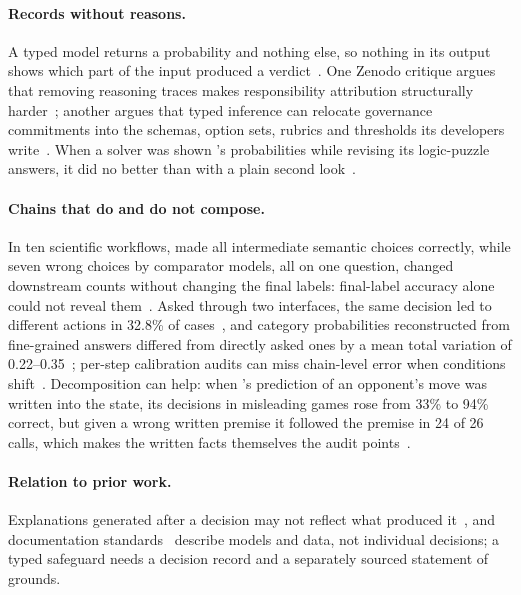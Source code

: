 \paragraph{Records without reasons.}
A typed model returns a probability and nothing else, so nothing in its output shows which part of the input produced a verdict~\cite{willison2026jev}.
One Zenodo critique argues that removing reasoning traces makes responsibility attribution structurally harder~\cite{zen22847531}\zmark{}; another argues that typed inference can relocate governance commitments into the schemas, option sets, rubrics and thresholds its developers write~\cite{zen22866847}\zmark{}.
When a solver was shown \jev{}'s probabilities while revising its logic-puzzle answers, it did no better than with a plain second look~\cite{zen22849329}\zmark{}.

\paragraph{Chains that do and do not compose.}
In ten scientific workflows, \jev{} made all intermediate semantic choices correctly, while seven wrong choices by comparator models, all on one question, changed downstream counts without changing the final labels: final-label accuracy alone could not reveal them~\cite{arx24965}.
Asked through two interfaces, the same decision led to different actions in 32.8\% of cases~\cite{arx37470}, and category probabilities reconstructed from fine-grained answers differed from directly asked ones by a mean total variation of 0.22--0.35~\cite{arx33971}; per-step calibration audits can miss chain-level error when conditions shift~\cite{zen23064668}\zmark{}.
Decomposition can help: when \jev{}'s prediction of an opponent's move was written into the state, its decisions in misleading games rose from 33\% to 94\% correct, but given a wrong written premise it followed the premise in 24 of 26 calls, which makes the written facts themselves the audit points~\cite{arx01834}.

\paragraph{Relation to prior work.}
Explanations generated after a decision may not reflect what produced it~\cite{doshivelez2017towards}, and documentation standards~\cite{mitchell2019model,gebru2021datasheets} describe models and data, not individual decisions; a typed safeguard needs a decision record and a separately sourced statement of grounds.


